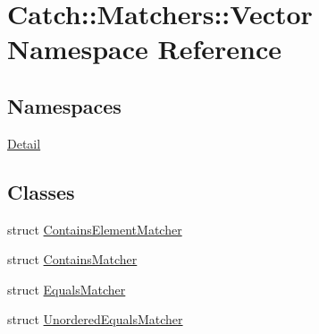 \hypertarget{namespace_catch_1_1_matchers_1_1_vector}{}\section{Catch\+:\+:Matchers\+:\+:Vector Namespace Reference}
\label{namespace_catch_1_1_matchers_1_1_vector}
\subsection*{Namespaces}
\begin{DoxyCompactItemize}
\item 
 \mbox{\hyperlink{namespace_catch_1_1_matchers_1_1_vector_1_1_detail}{Detail}}
\end{DoxyCompactItemize}
\subsection*{Classes}
\begin{DoxyCompactItemize}
\item 
struct \mbox{\hyperlink{struct_catch_1_1_matchers_1_1_vector_1_1_contains_element_matcher}{Contains\+Element\+Matcher}}
\item 
struct \mbox{\hyperlink{struct_catch_1_1_matchers_1_1_vector_1_1_contains_matcher}{Contains\+Matcher}}
\item 
struct \mbox{\hyperlink{struct_catch_1_1_matchers_1_1_vector_1_1_equals_matcher}{Equals\+Matcher}}
\item 
struct \mbox{\hyperlink{struct_catch_1_1_matchers_1_1_vector_1_1_unordered_equals_matcher}{Unordered\+Equals\+Matcher}}
\end{DoxyCompactItemize}
